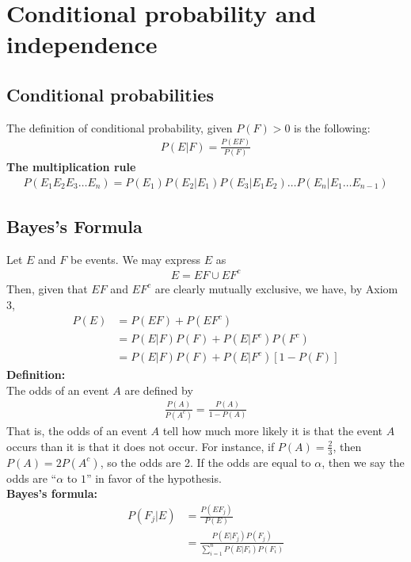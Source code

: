 \documentclass[a4paper]{article}
\begin{document}
\section{Conditional probability and independence} %
\label{sec:Conditional probability and independence}
\subsection{Conditional probabilities} %
\label{sub:Conditional probabilities}
The definition of conditional probability, given $P(F) >0$ is the following:
\begin{align}
  P(E|F)=\frac{P(EF)}{P(F)}
\end{align}
{\bf The multiplication rule}
\begin{align}
  P(E_1 E_2 E_3 \dots E_n) = P(E_1)P(E_2|E_1) P(E_3|E_1 E_2) \dots P(E_n| E_1 \dots E_{n-1})
\end{align}

\subsection{Bayes's Formula} %
\label{sub:Bayes's Formula}
Let $E$ and $F$ be events. We may express $E$ as
\begin{align}
  E=EF \cup EF^c
\end{align}
Then, given that $EF$ and $EF^c$ are clearly mutually exclusive, we have, by Axiom 3,
\begin{align}
  P(E) & = P(EF) + P(EF^c) \\
       & = P(E|F)P(F) + P(E|F^c)P(F^c) \\
       & = P(E|F)P(F) + P(E|F^c)[1-P(F)]
\end{align}
{\bf Definition:} \\
The odds of an event $A$ are defined by
\begin{align}
  \frac{P(A)}{P(A^c)} = \frac{P(A)}{1-P(A)}
\end{align}
That is, the odds of an event $A$ tell how much more likely it is that the event $A$ occurs than it is that it does not occur. 
For instance, if $P(A)=\frac{2}{3}$, then $P(A)=2P(A^c)$, so the odds are 2. If the odds are equal to $\alpha$, then we say
the odds are ``$\alpha$ to $1$'' in favor of the hypothesis. \\
{\bf Bayes's formula:} \\
\begin{align}
  P(F_j|E) & = \frac{P(EF_j)}{P(E)} \\
  & = \frac{P(E|F_j)P(F_j)}{\sum_{i=1}^n P(E|F_i)P(F_i)}
\end{align}
\end{document}

